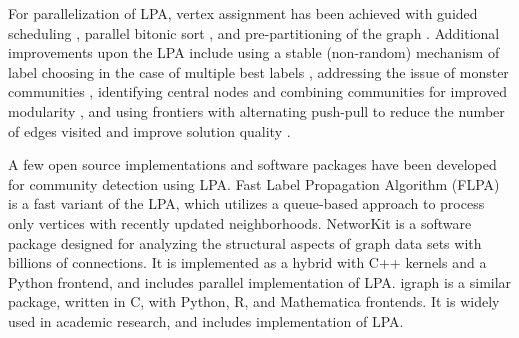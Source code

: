 For parallelization of LPA, vertex assignment has been achieved with guided scheduling \cite{staudt2015engineering}, parallel bitonic sort \cite{soman2011fast}, and pre-partitioning of the graph \cite{kuzmin2015parallelizing}. Additional improvements upon the LPA include using a stable (non-random) mechanism of label choosing in the case of multiple best labels \cite{com-xing14}, addressing the issue of monster communities \cite{com-berahmand18, com-sattari18}, identifying central nodes and combining communities for improved modularity \cite{com-you20}, and using frontiers with alternating push-pull to reduce the number of edges visited and improve solution quality \cite{com-liu20}.

A few open source implementations and software packages have been developed for community detection using LPA. Fast Label Propagation Algorithm (FLPA) \cite{traag2023large} is a fast variant of the LPA, which utilizes a queue-based approach to process only vertices with recently updated neighborhoods. NetworKit \cite{staudt2016networkit} is a software package designed for analyzing the structural aspects of graph data sets with billions of connections. It is implemented as a hybrid with C++ kernels and a Python frontend, and includes parallel implementation of LPA. igraph \cite{csardi2006igraph} is a similar package, written in C, with Python, R, and Mathematica frontends. It is widely used in academic research, and includes implementation of LPA.

